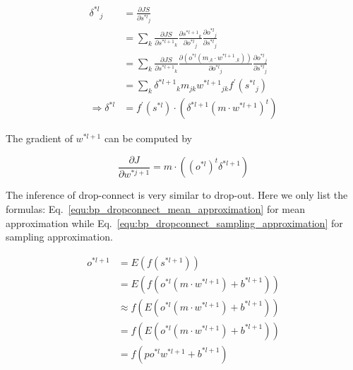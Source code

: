 \documentclass[runningheads,openany]{xhlPaper}
\begin{document}
\begin{equation}
\label{equ:bp_dropconnect_delta}
\begin{aligned}
{\delta ^{*l}}_j &= \frac{{\partial JS}}{{\partial {s^{*l}}_j}}\\
 &= \sum\limits_k {\frac{{\partial JS}}{{\partial {s^{*l + 1}}_k}}\frac{{\partial {s^{*l + 1}}_k}}{{\partial {o^{*l}}_j}}\frac{{\partial {o^{*l}}_j}}{{\partial {s^{*l}}_j}}} \\
 &= \sum\limits_k {\frac{{\partial JS}}{{\partial {s^{*l + 1}}_k}}\frac{{\partial \left( {{o^{*l}}\left( {{m_{\_k}} \cdot {w^{*l + 1}}_{\_k}} \right)} \right)}}{{\partial {o^{*l}}_j}}\frac{{\partial {o^{*l}}_j}}{{\partial {s^{*l}}_j}}} \\
 &= \sum\limits_k {{\delta ^{*l + 1}}_k{m_{jk}}{w^{*l + 1}}_{jk}{f^{'}}\left( {{s^{*l}}_j} \right)} \\
\Rightarrow {\delta ^{*l}} &= {f^{'}}\left( {{s^{*l}}} \right) \cdot \left( {{\delta ^{*l + 1}}{{\left( {m \cdot {w^{*l + 1}}} \right)}^t}} \right)
\end{aligned}
\end{equation}

The gradient of $w^{*l + 1}$ can be computed by 

\begin{equation}
\label{equ:bp_dropconnect_gradient}
\frac{{\partial J}}{{\partial {w^{*j + 1}}}} = m \cdot \left( {{{\left( {{o^{*l}}} \right)}^t}{\delta ^{*l + 1}}} \right)
\end{equation}

The inference of drop-connect is very similar to drop-out. Here we only list the formulas: Eq.~\ref{equ:bp_dropconnect_mean_approximation} for mean approximation while Eq.~\ref{equ:bp_dropconnect_sampling_approximation} for sampling approximation.

\begin{equation}
\label{equ:bp_dropconnect_mean_approximation}
\begin{aligned}
{o^{*l + 1}} &= E\left( {f\left( {{s^{*l + 1}}} \right)} \right)\\
 &= E\left( {f\left( {{o^{*l}}\left( {m \cdot {w^{*l + 1}}} \right) + {b^{*l + 1}}} \right)} \right)\\
 &\approx f\left( {E\left( {{o^{*l}}\left( {m \cdot {w^{*l + 1}}} \right) + {b^{*l + 1}}} \right)} \right)\\
 &= f\left( {E\left( {{o^{*l}}\left( {m \cdot {w^{*l + 1}}} \right) + {b^{*l + 1}}} \right)} \right)\\
 &= f\left( {p{o^{*l}}{w^{*l + 1}} + {b^{*l + 1}}} \right)
\end{aligned}
\end{equation}
\end{document}
